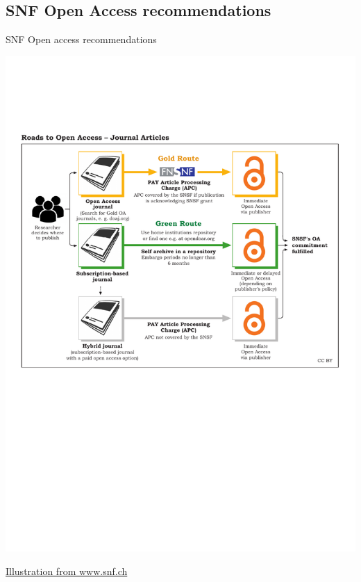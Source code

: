 \documentclass[10pt,compress,serif,aspectratio=169]{beamer}
\begin{document}
\subsection{SNF Open Access recommendations}
\begin{frame}[t]{SNF Open access recommendations}

  \begin{center}
    \includegraphics[width=.65\textwidth]{SNSF_Roads_to_OA_Articles}
  \end{center}
  \href{https://www.snf.ch/en/VyUvGzptStOEpUoC/topic/open-access-to-publications}{Illustration from www.snf.ch}
\end{frame}

\end{document}
